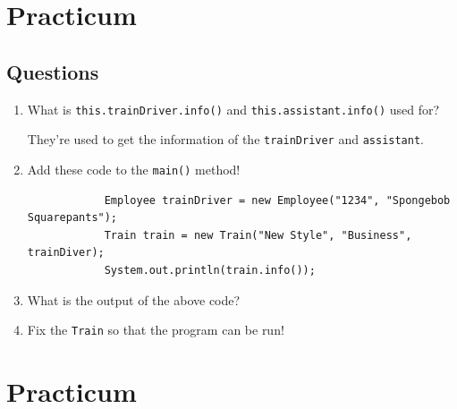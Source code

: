 \documentclass[12pt,titlepage]{article}
\begin{document}
\pagebreak

\section{Practicum}
\subsection{Questions}
\begin{enumerate}
    \item {
        What is \texttt{this.trainDriver.info()} and \texttt{this.assistant.info()} used for?

        They're used to get the information of the \texttt{trainDriver} and \texttt{assistant}.
    }
    \item {
        Add these code to the \texttt{main()} method!

        \begin{verbatim}
            Employee trainDriver = new Employee("1234", "Spongebob Squarepants");
            Train train = new Train("New Style", "Business", trainDiver);
            System.out.println(train.info());
        \end{verbatim}
    }
    \item {
        What is the output of the above code?
    }
    \item {
        Fix the \texttt{Train} so that the program can be run!
    }
\end{enumerate}

\section{Practicum}
\end{document}
